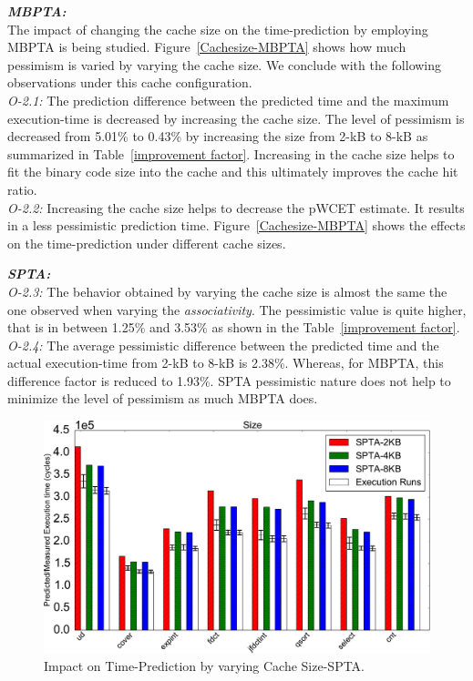 \textit{\textbf{MBPTA:}} \\
The impact of changing the cache size on the time-prediction by employing MBPTA is being studied. Figure~\ref{Cachesize-MBPTA} shows how much pessimism is varied by varying the cache size. We conclude with the following observations under this cache configuration.
\\
\textit{O-2.1:} The prediction difference between the predicted time  and the maximum execution-time is decreased by increasing the cache size. The level of pessimism is decreased from 5.01\% to 0.43\% by increasing the size from 2-kB to 8-kB as summarized in Table~\ref{improvement factor}. Increasing in the cache size helps to fit the binary code size into the cache and this ultimately improves the cache hit ratio.
\\
\textit{O-2.2:} Increasing the cache size helps to decrease the pWCET  estimate. It results in a less pessimistic prediction time. Figure~\ref{Cachesize-MBPTA} shows the effects on the time-prediction under different cache sizes.

\textit{\textbf{SPTA:}}\\
\textit{O-2.3:} The behavior obtained by varying the cache size is almost the same the one observed when varying the \textit{associativity}. The pessimistic value is quite higher, that is in between 1.25\% and 3.53\% as shown in the Table~\ref{improvement factor}.
\\
\textit{O-2.4:} The average pessimistic difference between the predicted time and the actual execution-time from 2-kB to 8-kB is 2.38\%. Whereas, for MBPTA, this difference factor is reduced to 1.93\%. SPTA pessimistic nature does not help to minimize the level of pessimism as much MBPTA does.

\begin{figure}[tb!]
\centering
\includegraphics[scale=0.4]{figures/cachesize-spta.pdf}
\caption{Impact on Time-Prediction by varying Cache Size-SPTA.}
\label{Cachesize-SPTA}
\end{figure}

